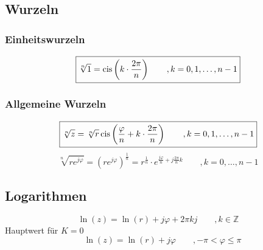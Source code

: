 \subsection{Wurzeln}

\subsubsection{Einheitswurzeln}
\[ \boxed{\sqrt[n]{1} = \operatorname{cis}\left(k \cdot \frac{2 \pi}{n}\right) 
\qquad , k = 0, 1, \ldots, n-1} \]

\subsubsection{Allgemeine Wurzeln}
\[ \boxed{\sqrt[n]{z} 
= \sqrt[n]{r}\operatorname{cis}\left(\frac{\varphi}{n} + k \cdot \frac{2 \pi}{n}\right) 
\qquad , k = 0, 1, \ldots, n-1} \]
\[ \boxed{\sqrt[n]{r e^{j \varphi}} 
= \left( r e^{j \varphi} \right)^{\frac{1}{n}} 
= r^{\frac{1}{n}} \cdot e^{\frac{j \varphi}{n} + j \frac{2 \pi}{n}k} 
\qquad , k = 0,\ldots, n - 1} \]

\subsection{Logarithmen}
\[ \boxed{\ln(z) = \ln(r) + j \varphi + 2 \pi k j \qquad , k \in \mathbb{Z}} \]
Hauptwert für $K = 0$
\[ \boxed{\quad \ln(z) = \ln(r) + j \varphi 
\qquad , -\pi < \varphi \leq \pi} \]
